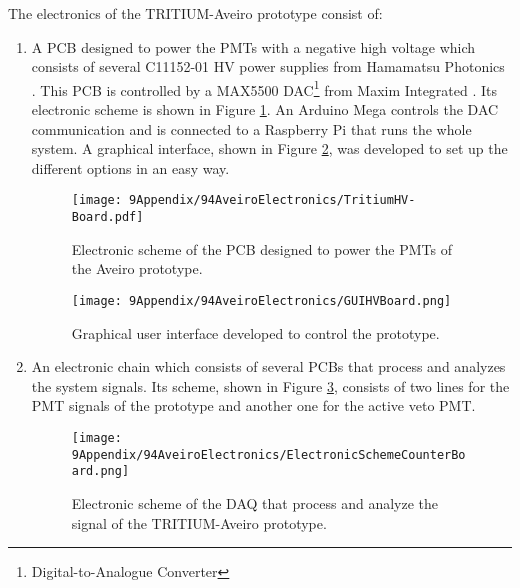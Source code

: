 The electronics of the TRITIUM-Aveiro prototype consist of:
\begin{enumerate}
\item{} A PCB designed to power the PMTs with a negative high voltage which consists of several C11152-01  HV power supplies from Hamamatsu Photonics \cite{PowerSupplyAveiroDataSheet}. This PCB is controlled by a MAX5500 DAC\footnote{Digital-to-Analogue Converter} from Maxim Integrated \cite{MAX5500DataSheet}. Its electronic scheme is shown in Figure \ref{fig:ElectronicSchemeHVBoard}.  An Arduino Mega controls the DAC communication and is connected to a Raspberry Pi that runs the whole system. A graphical interface, shown in Figure \ref{fig:GUIHVBoard}, was developed to set up the different options in an easy way.

\begin{figure}[h]
\centering
\texttt{[image: 9Appendix/94AveiroElectronics/TritiumHV-Board.pdf]}
\caption{Electronic scheme of the PCB designed to power the PMTs of the Aveiro prototype. \label{fig:ElectronicSchemeHVBoard}}
\end{figure}

\begin{figure}[h]
\centering
\texttt{[image: 9Appendix/94AveiroElectronics/GUIHVBoard.png]}
\caption{Graphical user interface developed to control the prototype. \label{fig:GUIHVBoard}}
\end{figure}

\item{} An electronic chain which consists of several PCBs that process and analyzes the system signals. Its scheme, shown in Figure \ref{fig:ElectronicSchemCounterBoard}, consists of two lines for the PMT signals of the prototype and another one for the active veto PMT.

\begin{figure}[h]
\centering
\texttt{[image: 9Appendix/94AveiroElectronics/ElectronicSchemeCounterBoard.png]}
\caption{Electronic scheme of the DAQ that process and analyze the signal of the TRITIUM-Aveiro prototype. \label{fig:ElectronicSchemCounterBoard}}
\end{figure}


\end{enumerate}
